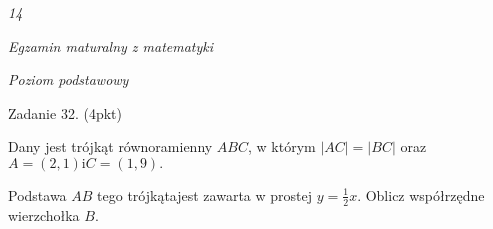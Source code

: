 \documentclass[a4paper,12pt]{article}
\begin{document}
{\it 14}

{\it Egzamin maturalny z matematyki}

{\it Poziom podstawowy}

Zadanie 32. (4pkt)

Dany jest trójkąt równoramienny $ABC$, w którym $|AC|=|BC|$ oraz $A=(2,1) \mathrm{i} C=(1,9).$

Podstawa $AB$ tego trójkątajest zawarta w prostej $y=\displaystyle \frac{1}{2}x$. Oblicz współrzędne wierzchołka $B.$
\end{document}
